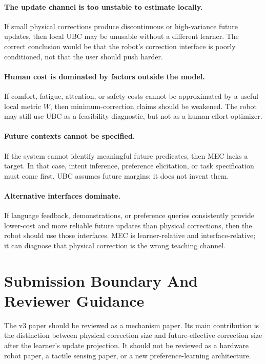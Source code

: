 \documentclass{article}
\begin{document}
\paragraph{The update channel is too unstable to estimate locally.}
If small physical corrections produce discontinuous or high-variance future
updates, then local UBC may be unusable without a different learner. The correct
conclusion would be that the robot's correction interface is poorly conditioned,
not that the user should push harder.

\paragraph{Human cost is dominated by factors outside the model.}
If comfort, fatigue, attention, or safety costs cannot be approximated by a
useful local metric $W$, then minimum-correction claims should be weakened. The
robot may still use UBC as a feasibility diagnostic, but not as a human-effort
optimizer.

\paragraph{Future contexts cannot be specified.}
If the system cannot identify meaningful future predicates, then MEC lacks a
target. In that case, intent inference, preference elicitation, or task
specification must come first. UBC assumes future margins; it does not invent
them.

\paragraph{Alternative interfaces dominate.}
If language feedback, demonstrations, or preference queries consistently provide
lower-cost and more reliable future updates than physical corrections, then the
robot should use those interfaces. MEC is learner-relative and interface-relative;
it can diagnose that physical correction is the wrong teaching channel.

\section{Submission Boundary And Reviewer Guidance}

The v3 paper should be reviewed as a mechanism paper. Its main contribution is
the distinction between physical correction size and future-effective correction
size after the learner's update projection. It should not be reviewed as a
hardware robot paper, a tactile sensing paper, or a new preference-learning
architecture.
\end{document}
